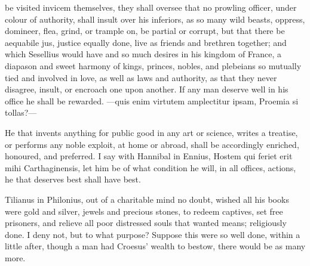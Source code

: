{be visited invicem themselves,  they shall oversee that no
prowling officer, under colour of authority, shall insult over his
inferiors, as so many wild beasts, oppress, domineer, flea, grind, or
trample on, be partial or corrupt, but that there be aequabile jus,
justice equally done, live as friends and brethren together; and which
Sesellius would have and so much desires in his kingdom of France,
a diapason and sweet harmony of kings, princes, nobles, and plebeians
so mutually tied and involved in love, as well as laws and authority,
as that they never disagree, insult, or encroach one upon another. If
any man deserve well in his office he shall be rewarded.
---quis enim virtutem amplectitur ipsam,
Proemia si tollas?---

He that invents anything for public good in any art or science, writes
a treatise, or performs any noble exploit, at home or abroad,
 shall be accordingly enriched, honoured, and preferred. I
say with Hannibal in Ennius, Hostem qui feriet erit mihi
Carthaginensis, let him be of what condition he will, in all offices,
actions, he that deserves best shall have best.

Tilianus in Philonius, out of a charitable mind no doubt, wished all
his books were gold and silver, jewels and precious stones, to
redeem captives, set free prisoners, and relieve all poor distressed
souls that wanted means; religiously done. I deny not, but to what
purpose? Suppose this were so well done, within a little after, though
a man had Croesus' wealth to bestow, there would be as many more.

}
